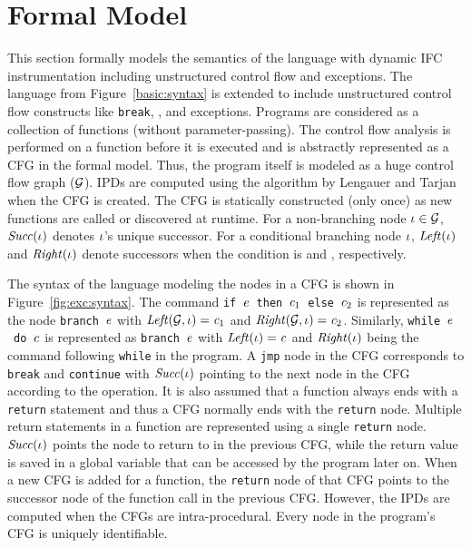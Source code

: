 \section{Formal Model} 
\label{sec:formalexc}

This section formally models the semantics of the language with
dynamic IFC instrumentation including unstructured control flow and
exceptions. The language from Figure~\ref{basic:syntax} is extended to
include unstructured control flow constructs like \texttt{break},
,  and exceptions. Programs are considered as a 
collection of functions (without parameter-passing). The control flow
analysis is performed on a function before it is executed and is
abstractly represented as a CFG in the formal model.
Thus, the program itself is modeled as a huge
control flow graph ($\mathcal{G}$). IPDs are computed using the algorithm by
Lengauer and Tarjan~\cite{Lengauer} when the CFG is created. The CFG
is statically constructed (only once) as new functions are called or
discovered at runtime. For a non-branching node $\iota \in \mathcal{G}$,
$\mathit{Succ}(\iota)$ denotes $\iota$’s unique successor. For a conditional 
branching node $\iota$,  $\mathit{Left}(\iota)$ and $\mathit{Right}(\iota)$ denote
successors when the condition is  and ,
respectively.  

The syntax of the language modeling the nodes in a CFG is shown in
Figure~\ref{fig:exc:syntax}. The command 
\texttt{if}~$\mathit{e}$~\texttt{then}~$\mathit{c}_1$~\texttt{else}~$\mathit{c}_2 $
is represented as the node \texttt{branch}~$\mathit{e}$ with $\mathit{Left}(\mathcal{G},
\iota) = \mathit{c}_1$ and $\mathit{Right}(\mathcal{G}, \iota) = \mathit{c}_2$. Similarly,
\texttt{while}~$\mathit{e}$~\texttt{do}~$\mathit{c}$ is represented as
\texttt{branch}~$\mathit{e}$ with $\mathit{Left}(\iota) = \mathit{c}$ and
$\mathit{Right}(\iota)$ being the command following \texttt{while} in the
program. A \texttt{jmp} node in the CFG corresponds to \texttt{break}
and \texttt{continue} with $\mathit{Succ}(\iota)$ pointing to the next
node in the CFG according to the operation. It is also assumed that a
function always ends with a \texttt{return} statement and thus a CFG
normally ends with the \texttt{return} node. Multiple return
statements in a function are represented using a single
\texttt{return} node. $\mathit{Succ}(\iota)$ points the
node to return to in the previous CFG, while the return value is saved
in a global variable that can be accessed by the program later on. 
When a new CFG is added for a function, the \texttt{return} node of
that CFG points to the successor node of the function call in the
previous CFG. However, the IPDs are computed when the CFGs are
intra-procedural. Every node in the program's CFG is uniquely
identifiable. 

